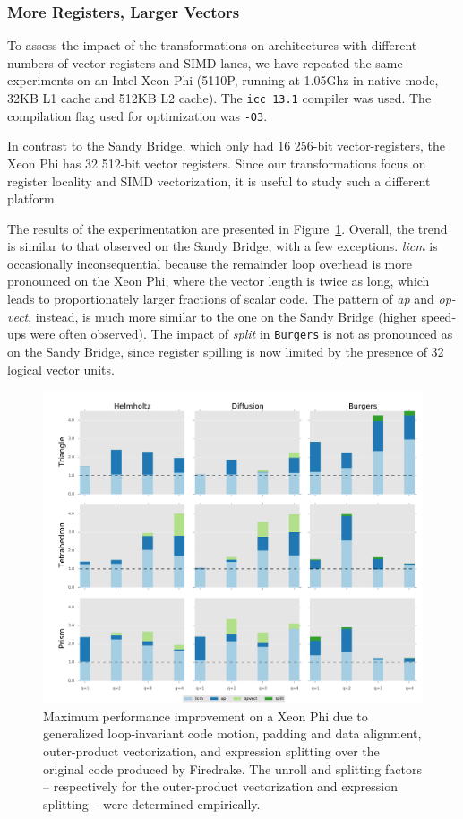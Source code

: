 \subsubsection{More Registers, Larger Vectors}
To assess the impact of the transformations on architectures with different numbers of vector registers and SIMD lanes, we have repeated the same experiments on an Intel Xeon Phi (5110P, running at 1.05Ghz in native mode, 32KB L1 cache and 512KB L2 cache). The \texttt{icc 13.1} compiler was used. The compilation flag used for optimization was \texttt{-O3}. 

In contrast to the Sandy Bridge, which only had 16 256-bit vector-registers, the Xeon Phi has 32 512-bit vector registers. Since our transformations focus on register locality and SIMD vectorization, it is useful to study such a different platform. 

The results of the experimentation are presented in Figure~\ref{fig:coffee-individual-res-phi}. Overall, the trend is similar to that observed on the Sandy Bridge, with a few exceptions. {\em licm} is occasionally inconsequential because the remainder loop overhead is more pronounced on the Xeon Phi, where the vector length is twice as long, which leads to proportionately larger fractions of scalar code. The pattern of {\em ap} and {\em op-vect}, instead, is much more similar to the one on the Sandy Bridge (higher speed-ups were often observed). The impact of {\em split} in {\tt Burgers} is not as pronounced as on the Sandy Bridge, since register spilling is now limited by the presence of 32 logical vector units. 

\begin{figure}[t]
\centerline{\includegraphics[scale=0.45]{lowlevelopt/perf-results/individual/plot_phi}}
\caption{Maximum performance improvement on a Xeon Phi due to generalized loop-invariant code motion, padding and data alignment, outer-product vectorization, and expression splitting over the original code produced by Firedrake. The unroll and splitting factors -- respectively for the outer-product vectorization and expression splitting -- were determined empirically.}
\label{fig:coffee-individual-res-phi}
\end{figure}



